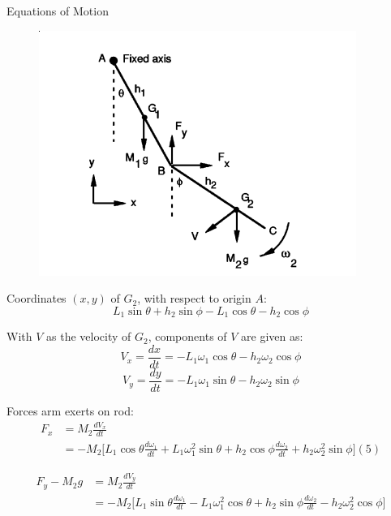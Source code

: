\documentclass[tikz]{beamer}
\begin{document}
\begin{frame} {Equations of Motion}

	 {
		\begin{figure}
			\centering
			\includegraphics[scale=0.75]{equationsofmotion.png}
		\end{figure}
	}
	
	 {
		Coordinates $(x,y)$ of $G_2$, with respect to origin $A$:
		\begin{equation}
			L_1 \sin{\theta} + h_2 \sin{\phi} - L_1 \cos{\theta} - h_2 \cos{\phi} \tag{2}
		\end{equation}
		
		With $V$ as the velocity of $G_2$, components of $V$ are given as:
		\begin{equation}
			V_x = \frac{dx}{dt} = -L_1 \omega_1 \cos{\theta} - h_2 \omega_2 \cos{\phi} \tag{3}
		\end{equation}
		\begin{equation}
			V_y = \frac{dy}{dt} = -L_1 \omega_1 \sin{\theta} - h_2 \omega_2 \sin{\phi} \tag{4}
		\end{equation}
	}

	 {
		Forces arm exerts on rod:
		\begin{equation*}
			\begin{aligned}
				F_x & = M_2 \frac{d V_x}{dt} \\
				    & = -M_2 \bigg [ L_1 \cos{\theta} \frac{d \omega_1}{dt} + L_1 \omega_1^2 \sin{\theta} + h_2 \cos{\phi} \frac{d \omega_2}{dt} + h_2 \omega_2^2 \sin{\phi} \bigg ] (5)
			\end{aligned}
		\end{equation*}

		\begin{equation*}
			\begin{aligned}
				F_y - M_2 g & = M_2 \frac{d V_y}{dt}\\
				   & = -M_2 \bigg [ L_1 \sin{\theta} \frac{d \omega_1}{dt} - L_1 \omega_1^2 \cos{\theta} + h_2 \sin{\phi} \frac{d \omega_2}{dt} - h_2 \omega_2^2 \cos{\phi} \bigg ] %
			\end{aligned}
		\end{equation*}
	}


\end{frame}
\end{document}
